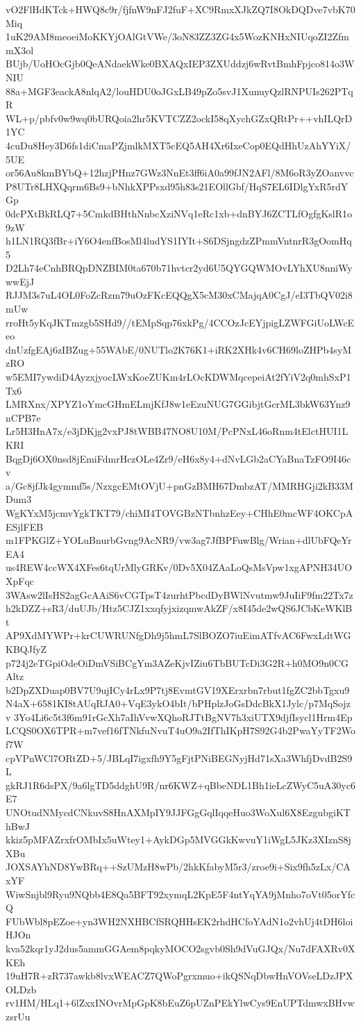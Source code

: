 vO2FlHdKTck+HWQ8c9r/fjfnW9nFJ2fuF+XC9RmxXJkZQ7I8OkDQDve7vbK70Miq
1uK29AM8meoeiMoKKYjOAlGtVWe/3oN83ZZ3ZG4x5WozKNHxNIUqoZI2ZfmmX3ol
BUjb/UoHOcGjb0QeANdaekWke0BXAQxIEP3ZXUddzj6wRvtBmhFpjco814o3WNIU
88a+MGF3eackA8nlqA2/louHDU0oJGxLB49pZo5svJ1XunuyQzlRNPUIs262PTqR
WL+p/pbfv0w9wq0bURQoia2hr5KVTCZZ2ockI58qXychGZxQRtPr++vhILQrD1YC
4cuDu8Hey3D6fs1diCmaPZjmlkMXT5cEQ5AH4Xr6IxeCop0EQdHhUzAhYYiX/5UE
or56Au8kmBYbQ+12hzjPHnz7GWz3NnEt3ff6iA0a99fJN2AFl/8M6oR3yZOanvvc
P8UTr8LHXQqrm6Bs9+bNhkXPPsxd95h83s21EOllGbf/HqS7EL6IDlgYxR5rdYGp
0dcPXtBkRLQ7+5CmkdBHthNnbcXziNVq1eRc1xb+dnBYJ6ZCTLfOgfgKslR1o9zW
h1LN1RQ3fBr+iY6O4enfBosMl4ludYS1IYIt+S6DSjngdzZPmmVntnrR3gOomHq5
D2Lh74eCnhBRQpDNZBIM0ta670b71hvtcr2yd6U5QYGQWMOvLYhXU8nniWywwEjJ
RJJM3s7uL4OL0FoZcRzm79uOzFKcEQQgX5cM30xCMajqA0CgJ/eI3TbQV02i8mUw
rroHt5yKqJKTmzgb5SHd9//tEMpSqp76xkPg/4CCOzJcEYjpigLZWFGiUoLWcEeo
dnUzfgEAj6zIBZug+55WAbE/0NUTlo2K76K1+iRK2XHk4v6CH69loZHPb4syMzRO
w5EMI7ywdiD4AyzxjyocLWxKoeZUKm4rLOcKDWMqcepeiAt2fYiV2q0mhSxP1Tx6
LMRXnx/XPYZ1oYmcGHmELmjKfJ8w1eEzuNUG7GGibjtGcrML3bkW63Ynz9nCPB7e
Lr5H3HnA7x/e3jDKjg2vxPJ8tWBB47NO8U10M/PcPNxL46oRnm4tElctHUI1LKRI
BqgDj6OX0nsd8jEmiFdmrHczOLe4Zr9/eH6x8y4+dNvLGb2aCYaBnaTzFO9I46cv
a/Gc8jfJk4gymmf5s/NzxgcEMtOVjU+pnGzBMH67DmbzAT/MMRHGji2kB33MDum3
WgKYxM5jcmvYgkTKT79/chiMI4TOVGBzNTbnhzEey+CHhE0mcWF4OKCpAESjlFEB
m1FPKGlZ+YOLuBnurbGvng9AcNR9/vw3ag7JfBPFuwBlg/Wrian+dlUbFQeYrEA4
us4REW4ccWX4XFes6tqUrMlyGRKv/0Dv5X04ZAaLoQsMsVpw1xgAPNH34UOXpFqc
3WAsw2lIsHS2agGcAAiS6vCGTpsT4zurhtPbcdDyBWlNvutmw9JuIiF9fm22Tx7z
h2kDZZ+sR3/duUJb/Htz5CJZ1xxqfyjxizqmwAkZF/x8I45de2wQS6JCbKeWKlBt
AP9XdMYWPr+krCUWRUNfgDh9j5hmL7SlBOZO7iuEimATfvAC6FwxLdtWGKBQJfyZ
p724j2eTGpiOdeOiDmVSiBCgYm3AZeKjvIZiu6TbBUTcDi3G2R+h0MO9n0CGAltz
b2DpZXDuap0BV7U9ujICy4rLx9P7tj8EvmtGV19XErxrbn7rbut1fgZC2bbTgxu9
N4aX+6581KI8tAUqRJA0+VqE3ykO4bIt/bPHplzJoGsDdcBkX1Jylc/p7MqSojzv
3Yo4Li6c5t3f6m91rGcXh7aIhVvwXQhoRJTtBgNV7h3xiUTX9djfIsycl1Hrm4Ep
LCQS0OX6TPR+m7vef16fTNkfuNvuT4uO9a2IfThIKpH7S92G4b2PwaYyTF2Wof7W
cpVPnWCl7ORtZD+5/JBLqI7igxfh9Y5gFjtPNiBEGNyjHd71sXa3WhfjDvdB2S9L
gkRJ1R6dsPX/9a6lgTD5ddghU9R/nr6KWZ+qBbeNDL1Bh1ieLcZWyC5uA30yc6E7
UNOtudNMycdCNkuvS8HnAXMpIY9JJFGgGqlIqqeHuo3WoXul6X8EzgubgiKThBwJ
kkiz5pMFAZrxfrOMbIx5uWtey1+AykDGp5MVGGkKwvuY1iWgL5JKz3XIznS8jXBu
JOXSAYhND8YwBRq++SzUMzH8wPb/2hkKfabyM5r3/zroe9i+Six9fh5zLx/CAxYF
WiwSnjbl9Ryu9NQbb4E8Qa5BFT92xymqL2KpE5F4ntYqYA9jMnho7oVt05orYfcQ
FUbWbl8pEZoe+yn3WH2NXHBCfSRQHHsEK2rhdHCfoYAdN1o2vhUj4tDH6loiHJOn
kva52kqr1yJ2dus5ammGGAem8pqkyMOCO2sgvb0Sh9dVuGJQx/Nu7dFAXRv0XKEh
19uH7R+zR737awkb8lvxWEACZ7QWoPgrxmuo+ikQSNqDbwHnVOVseLDzJPXOLDzb
rv1HM/HLq1+6lZxxINOvrMpGpK8bEuZ6pUZnPEkYlwCys9EnUPTdmwxBHvwzsrUu
